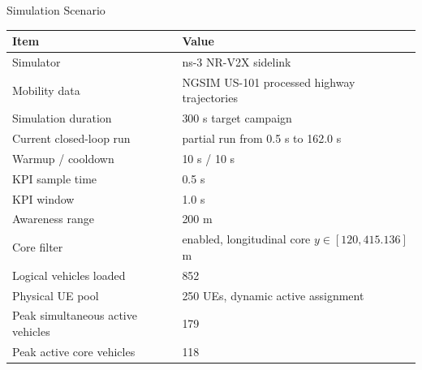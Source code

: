 \documentclass[aspectratio=1610,10pt]{beamer}
\begin{document}
\begin{frame}{Simulation Scenario}
  \begin{table}
    \centering
    \scriptsize
    \begin{tabular}{ll}
      \toprule
      Item & Value \\
      \midrule
      Simulator & ns-3 NR-V2X sidelink \\
      Mobility data & NGSIM US-101 processed highway trajectories \\
      Simulation duration & 300 s target campaign \\
      Current closed-loop run & partial run from 0.5 s to 162.0 s \\
      Warmup / cooldown & 10 s / 10 s \\
      KPI sample time & 0.5 s \\
      KPI window & 1.0 s \\
      Awareness range & 200 m \\
      Core filter & enabled, longitudinal core $y \in [120,415.136]$ m \\
      Logical vehicles loaded & 852 \\
      Physical UE pool & 250 UEs, dynamic active assignment \\
      Peak simultaneous active vehicles & 179 \\
      Peak active core vehicles & 118 \\
      \bottomrule
    \end{tabular}
  \end{table}
\end{frame}
\end{document}
